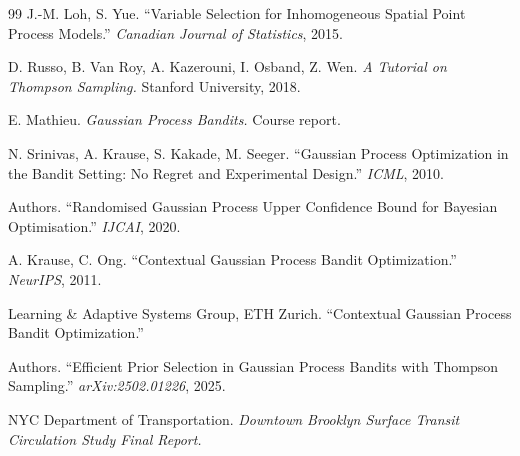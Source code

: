 \documentclass[sigconf,nonacm]{acmart}
\begin{document}
\begin{thebibliography}{99}
J.-M. Loh, S. Yue. ``Variable Selection for Inhomogeneous Spatial Point Process Models.'' \emph{Canadian Journal of Statistics}, 2015.

D. Russo, B. Van Roy, A. Kazerouni, I. Osband, Z. Wen. \emph{A Tutorial on Thompson Sampling.} Stanford University, 2018.

E. Mathieu. \emph{Gaussian Process Bandits.} Course report.

N. Srinivas, A. Krause, S. Kakade, M. Seeger. ``Gaussian Process Optimization in the Bandit Setting: No Regret and Experimental Design.'' \emph{ICML}, 2010.

Authors. ``Randomised Gaussian Process Upper Confidence Bound for Bayesian Optimisation.'' \emph{IJCAI}, 2020.

A. Krause, C. Ong. ``Contextual Gaussian Process Bandit Optimization.'' \emph{NeurIPS}, 2011.

Learning \& Adaptive Systems Group, ETH Zurich. ``Contextual Gaussian Process Bandit Optimization.''

Authors. ``Efficient Prior Selection in Gaussian Process Bandits with Thompson Sampling.'' \emph{arXiv:2502.01226}, 2025.

NYC Department of Transportation. \emph{Downtown Brooklyn Surface Transit Circulation Study Final Report.}

\end{thebibliography}
\end{document}
